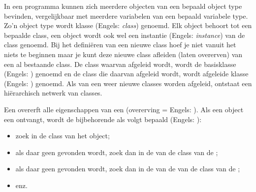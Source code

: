 \begin{cpplstShortInline}
In een programma kunnen zich meerdere objecten van een bepaald object type bevinden, vergelijkbaar met meerdere variabelen van een bepaald variabele type.
Zo'n object type wordt klasse (Engels: \emph{class}) genoemd.
Elk object behoort tot een bepaalde class, een object wordt ook wel een instantie (Engels: \emph{instance}) van de class genoemd.
Bij het definiëren van een nieuwe class hoef je niet vanuit het niets te beginnen maar je kunt deze nieuwe class afleiden (laten overerven) van een al bestaande class.
De class waarvan afgeleid wordt, wordt de basisklasse (Engels: \emph{}) genoemd en de class die daarvan afgeleid wordt, wordt afgeleide klasse (Engels: \emph{}) genoemd.
Als van een  weer nieuwe classes worden afgeleid, ontstaat een hiërarchisch netwerk van classes.

Een  overerft alle eigenschappen van een  (overerving = Engels: \emph{}).
Als een object een  ontvangt, wordt de bijbehorende  als volgt bepaald (Engels: \emph{}):
\begin{itemize}
    \item zoek in de class van het  object;
    \item als daar geen  gevonden wordt, zoek dan in de  van de class van de ;
    \item als daar geen  gevonden wordt, zoek dan in de  van de  van de class van de ;
    \item enz.
\end{itemize}


\end{cpplstShortInline}
